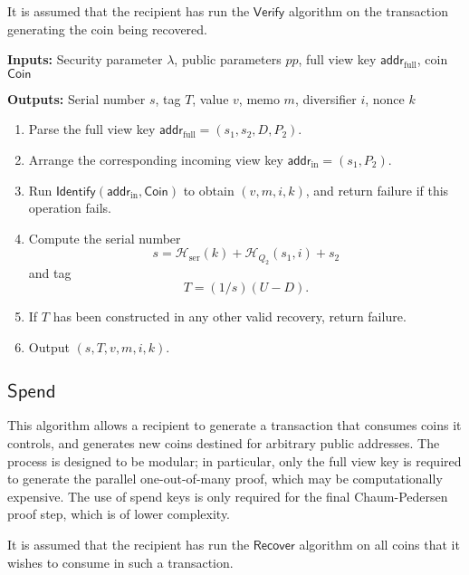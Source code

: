 \documentclass{llncs}
\newcommand{\hash}{\mathcal{H}}
\newcommand{\func}[1]{\mathsf{#1}}
\newcommand{\addr}{\func{addr}}
\begin{document}
It is assumed that the recipient has run the $\func{Verify}$ algorithm on the transaction generating the coin being recovered.

\textbf{Inputs:} Security parameter $\lambda$, public parameters $pp$, full view key $\addr_{\text{full}}$, coin $\func{Coin}$

\textbf{Outputs:} Serial number $s$, tag $T$, value $v$, memo $m$, diversifier $i$, nonce $k$

\begin{enumerate}
\item Parse the full view key $\addr_{\text{full}} = (s_1, s_2, D, P_2)$.
\item Arrange the corresponding incoming view key $\addr_{\text{in}} = (s_1, P_2)$.
\item Run $\func{Identify}(\addr_{\text{in}},\func{Coin})$ to obtain $(v, m, i, k)$, and return failure if this operation fails.
\item Compute the serial number $$s = \hash_{\text{ser}}(k) + \hash_{Q_2}(s_1,i) + s_2$$ and tag $$T = (1/s)(U - D).$$
\item If $T$ has been constructed in any other valid recovery, return failure.
\item Output $(s, T, v, m, i, k)$.
\end{enumerate}


\subsection{\texorpdfstring{$\func{Spend}$}{Spend}}

This algorithm allows a recipient to generate a transaction that consumes coins it controls, and generates new coins destined for arbitrary public addresses.
The process is designed to be modular; in particular, only the full view key is required to generate the parallel one-out-of-many proof, which may be computationally expensive.
The use of spend keys is only required for the final Chaum-Pedersen proof step, which is of lower complexity.

It is assumed that the recipient has run the $\func{Recover}$ algorithm on all coins that it wishes to consume in such a transaction.
\end{document}
